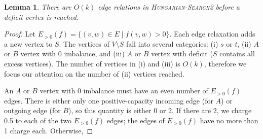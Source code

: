 \documentclass[11pt]{article}
\theoremstyle{plain}
\newtheorem{lemma}{Lemma}
\begin{document}
\begin{lemma}
\label{lemma:goldberg_hs_length}
	There are $O(k)$ edge relations in \textsc{Hungarian-Search2} before
	a deficit vertex is reached.
\end{lemma}
\begin{proof}
	Let $E_{>0}(f) = \{(v, w) \in E \mid f(v, w) > 0\}$.
	Each edge relaxation adds a new vertex to $S$.
	The vertices of $V \setminus S$ fall into several categories: 
	(i) $s$ or $t$, (ii) $A$ or $B$ vertex with 0 imbalance, and (iii) $A$ 
	or $B$ vertex with deficit ($S$ contains all excess vertices).
	The number of vertices in (i) and (iii) is $O(k)$, therefore we focus
	our attention on the number of (ii) vertices reached.

	An $A$ or $B$ vertex with 0 imbalance must have an even number of 
	$E_{>0}(f)$ edges.
	There is either only one positive-capacity incoming edge (for $A$) or 
	outgoing edge (for $B$), so this quantity is either 0 or 2.
	If there are 2, we charge 0.5 to each of the two $E_{>0}(f)$ edges;
	the edges of $E_{>0}(f)$ have no more than 1 charge each.
	Otherwise, %
	
\end{proof}
\end{document}

